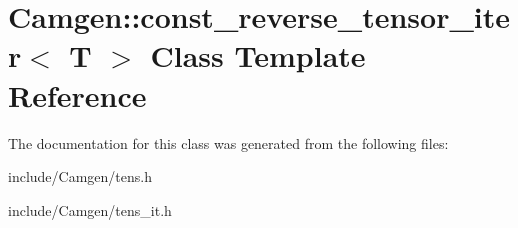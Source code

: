 \hypertarget{a00106}{\section{Camgen\-:\-:const\-\_\-reverse\-\_\-tensor\-\_\-iter$<$ T $>$ Class Template Reference}
\label{a00106}
}


The documentation for this class was generated from the following files\-:\begin{DoxyCompactItemize}
\item 
include/\-Camgen/tens.\-h\item 
include/\-Camgen/tens\-\_\-it.\-h\end{DoxyCompactItemize}
